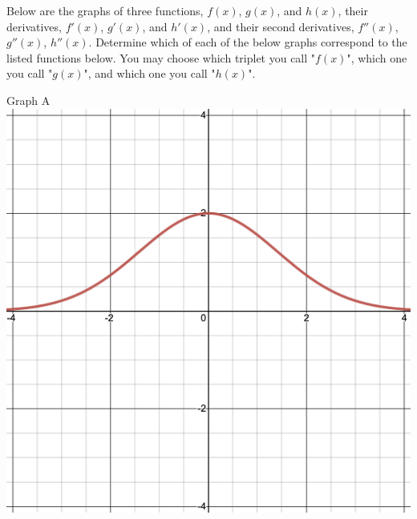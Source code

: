 \documentclass{siproblemset}
\begin{document}
    \newpage
    
    \newpage
    
    \begin{multipartquestion}{Below are the graphs of three functions, $f(x)$, $g(x)$, and $h(x)$, their derivatives, $f'(x)$, $g'(x)$, and $h'(x)$, and their second derivatives, $f''(x)$, $g''(x)$, $h''(x)$. Determine which of each of the below graphs correspond to the listed functions below. You may choose which triplet you call "$f(x)$", which one you call "$g(x)$", and which one you call "$h(x)$". }
        \begin{multicols}{3}
            \begin{center}
                Graph A
                \includegraphics[width=\linewidth]{img/pt2-graph3a}
            \end{center}

\end{multicols}
\end{multipartquestion}
\end{document}
